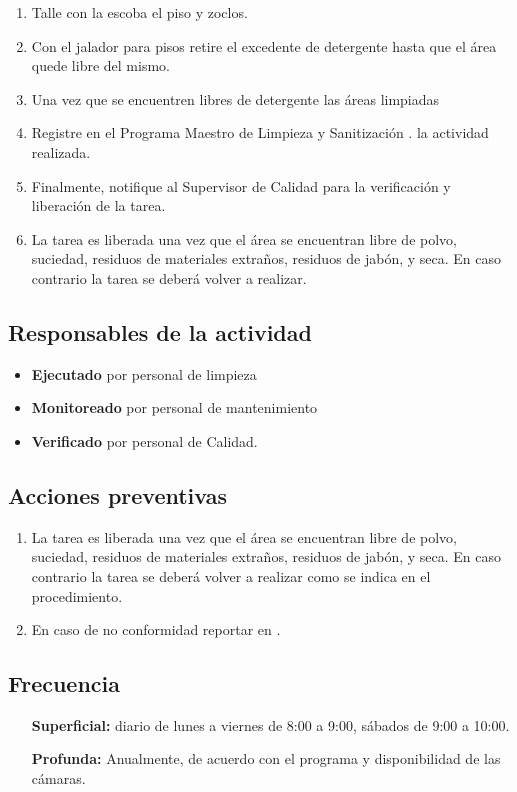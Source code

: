 \begin{enumerate}
	\item Talle con la escoba el piso y zoclos.
	\item Con el jalador para pisos retire el excedente de detergente hasta que el área quede libre del mismo.
	\item Una vez que se encuentren libres de detergente las áreas limpiadas
	\item Registre en el Programa Maestro de Limpieza y Sanitización \RAC. la actividad realizada.
	\item Finalmente, notifique al Supervisor de Calidad para la verificación y liberación de la tarea.
	\item La tarea es liberada una vez que el área se encuentran libre de polvo, suciedad, residuos de materiales extraños, residuos de jabón, y seca. En caso contrario la tarea se deberá volver a realizar.
\end{enumerate}

\subsection{Responsables de la actividad}
\begin{itemize}
	\item \textbf{Ejecutado} por personal de limpieza
	\item \textbf{Monitoreado} por personal de mantenimiento
	\item \textbf{Verificado} por personal de Calidad.
\end{itemize}

\subsection{Acciones preventivas}
\begin{enumerate}
	\item La tarea es liberada una vez que el área se encuentran libre de polvo, suciedad, residuos de materiales extraños, residuos de jabón, y seca. En caso contrario la tarea se deberá volver a realizar como se indica en el procedimiento.
	\item En caso de no conformidad reportar en \RAC.
\end{enumerate}

\subsection{Frecuencia}
\begin{itemize}
	\item[\textbf{Superficial:}] diario de lunes a viernes de 8:00 a 9:00, sábados de 9:00 a 10:00.
	\item[\textbf{Profunda:}] Anualmente, de acuerdo con el programa y disponibilidad de las cámaras.
\end{itemize}

